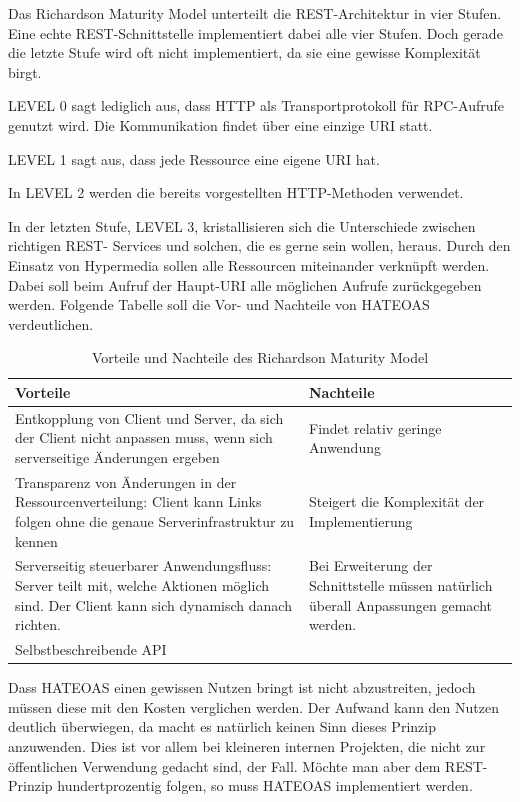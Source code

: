 Das Richardson Maturity Model unterteilt die \ac{REST}-Architektur in vier Stufen. Eine echte
\ac{REST}-Schnittstelle implementiert dabei alle vier Stufen. Doch gerade die letzte Stufe wird oft
nicht implementiert, da sie eine gewisse Komplexität birgt.

LEVEL 0 sagt lediglich aus, dass \ac{HTTP} als Transportprotokoll für \ac{RPC}-Aufrufe genutzt wird.
Die Kommunikation findet über eine einzige \ac{URI} statt.

LEVEL 1 sagt aus, dass jede Ressource eine eigene \ac{URI} hat.

In LEVEL 2 werden die bereits vorgestellten \ac{HTTP}-Methoden verwendet.

In der letzten Stufe, LEVEL 3, kristallisieren sich die Unterschiede zwischen richtigen \ac{REST}-
Services und solchen, die es gerne sein wollen, heraus. Durch den Einsatz von Hypermedia sollen alle
Ressourcen miteinander verknüpft werden. Dabei soll beim Aufruf der Haupt-\ac{URI} alle
möglichen Aufrufe zurückgegeben werden. Folgende Tabelle soll die Vor- und Nachteile von
HATEOAS verdeutlichen.
\newline

\begin{table}[H]
	\begin{tabular}{ | p{7cm} | p{7cm} | }	
		\hline	
		Vorteile & Nachteile \\  \hline	
		Entkopplung von Client und Server, da sich der Client nicht anpassen muss,
		wenn sich serverseitige Änderungen ergeben & 
		Findet relativ geringe Anwendung	 \\ \hline
		Transparenz von Änderungen in der Ressourcenverteilung: 
		Client kann Links folgen ohne die genaue Serverinfrastruktur zu kennen 
		& Steigert die Komplexität der Implementierung \\ \hline
		Serverseitig steuerbarer Anwendungsfluss: Server teilt mit, welche Aktionen möglich sind. 
		Der Client kann sich dynamisch danach richten.
		 & Bei Erweiterung der Schnittstelle müssen natürlich überall Anpassungen gemacht werden. \\ \hline
		Selbstbeschreibende API &  \\ \hline
	\end{tabular}
	\caption{Vorteile und Nachteile des Richardson Maturity Model}
\end{table}

Dass HATEOAS einen gewissen Nutzen bringt ist nicht abzustreiten, jedoch müssen diese mit den Kosten verglichen werden. Der Aufwand kann den Nutzen deutlich überwiegen, da macht es natürlich keinen Sinn dieses Prinzip anzuwenden. Dies ist vor allem bei kleineren internen Projekten, die nicht zur öffentlichen Verwendung gedacht sind, der Fall. Möchte man aber dem \ac{REST}-Prinzip hundertprozentig folgen, so muss HATEOAS implementiert werden.
